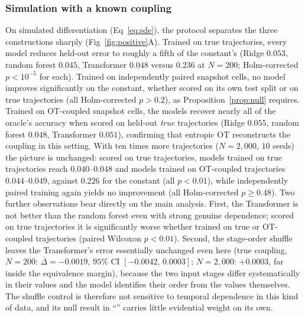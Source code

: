 \documentclass[10pt,letterpaper]{article}
\begin{document}
\subsubsection*{Simulation with a known coupling}
On simulated differentiation (Eq~\ref{eq:sde}), the protocol separates the three constructions sharply (Fig~\ref{fig:positive}A). Trained on true trajectories, every model reduces held-out error to roughly a fifth of the constant's (Ridge $0.053$, random forest $0.045$, Transformer $0.048$ versus $0.236$ at $N=200$; Holm-corrected $p<10^{-5}$ for each). Trained on independently paired snapshot cells, no model improves significantly on the constant, whether scored on its own test split or on true trajectories (all Holm-corrected $p>0.2$), as Proposition~\ref{prop:null} requires. Trained on OT-coupled snapshot cells, the models recover nearly all of the oracle's accuracy when scored on held-out \emph{true} trajectories (Ridge $0.055$, random forest $0.048$, Transformer $0.051$), confirming that entropic OT reconstructs the coupling in this setting. With ten times more trajectories ($N=2{,}000$, $10$ seeds) the picture is unchanged: scored on true trajectories, models trained on true trajectories reach $0.040$--$0.048$ and models trained on OT-coupled trajectories $0.044$--$0.049$, against $0.226$ for the constant (all $p<0.01$), while independently paired training again yields no improvement (all Holm-corrected $p\ge0.48$). Two further observations bear directly on the main analysis. First, the Transformer is not better than the random forest even with strong genuine dependence; scored on true trajectories it is significantly worse whether trained on true or OT-coupled trajectories (paired Wilcoxon $p<0.01$). Second, the stage-order shuffle leaves the Transformer's error essentially unchanged even here (true coupling, $N=200$: $\overline{\Delta}=-0.0019$, $95\%$ CI $[-0.0042,\,0.0003]$; $N=2{,}000$: $+0.0003$, far inside the equivalence margin), because the two input stages differ systematically in their values and the model identifies their order from the values themselves. The shuffle control is therefore not sensitive to temporal dependence in this kind of data, and its null result in ``'' carries little evidential weight on its own.
\end{document}
